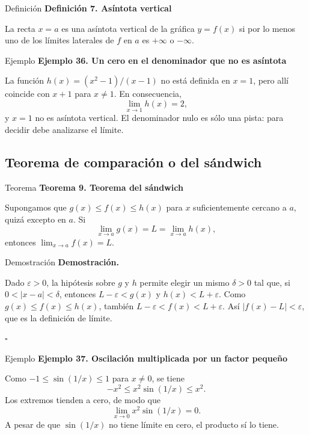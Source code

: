 \documentclass[12pt,aspectratio=169]{beamer}
\begin{document}
\begin{frame}[t,allowframebreaks]{Definición}
{\color{azul}\bfseries Definición 7. Asíntota vertical}\par\medskip

La recta $x=a$ es una asíntota vertical de la gráfica $y=f(x)$ si por lo menos uno de los límites laterales de $f$ en $a$ es $+\infty$ o $-\infty$.
\end{frame}


\begin{frame}[t,allowframebreaks]{Ejemplo}
{\color{azul}\bfseries Ejemplo 36. Un cero en el denominador que no es asíntota}\par\medskip

La función $h(x)=(x^2-1)/(x-1)$ no está definida en $x=1$, pero allí coincide con $x+1$ para $x\ne1$. En consecuencia,
\[
 \lim_{x\to1}h(x)=2,
\]
y $x=1$ no es asíntota vertical. El denominador nulo es sólo una pista: para decidir debe analizarse el límite.
\end{frame}


\subsection{Teorema de comparación o del sándwich}

\begin{frame}[t,allowframebreaks]{Teorema}
{\color{azul}\bfseries Teorema 9. Teorema del sándwich}\par\medskip

Supongamos que $g(x)\le f(x)\le h(x)$ para $x$ suficientemente cercano a $a$, quizá excepto en $a$. Si
\[
 \lim_{x\to a}g(x)=L=\lim_{x\to a}h(x),
\]
entonces $\lim_{x\to a}f(x)=L$.
\end{frame}


\begin{frame}[t,allowframebreaks]{Demostración}
{\color{azul}\bfseries Demostración.}\par\smallskip

Dado $\varepsilon>0$, la hipótesis sobre $g$ y $h$ permite elegir un mismo $\delta>0$ tal que, si $0<|x-a|<\delta$, entonces $L-\varepsilon<g(x)$ y $h(x)<L+\varepsilon$. Como $g(x)\le f(x)\le h(x)$, también $L-\varepsilon<f(x)<L+\varepsilon$. Así $|f(x)-L|<\varepsilon$, que es la definición de límite.

\hfill $\square$
\end{frame}


\begin{frame}[t,allowframebreaks]{Ejemplo}
{\color{azul}\bfseries Ejemplo 37. Oscilación multiplicada por un factor pequeño}\par\medskip

Como $-1\le\sin(1/x)\le1$ para $x\ne0$, se tiene
\[
 -x^2\le x^2\sin(1/x)\le x^2.
\]
Los extremos tienden a cero, de modo que
\[
 \boxed{\lim_{x\to0}x^2\sin(1/x)=0.}
\]
A pesar de que $\sin(1/x)$ no tiene límite en cero, el producto sí lo tiene.
\end{frame}
\end{document}
